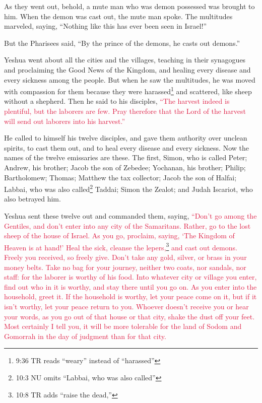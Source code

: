 \myverse{}As they went out, behold, a mute man who was demon possessed
was brought to him.
\myverse{}When the demon was cast out, the mute man spoke. The multitudes marveled,
saying, “Nothing like this has ever been seen in Israel!”

\myverse{}But the Pharisees said, “By the prince of the demons, he casts
out demons.”

\myverse{}Yeshua went about all the cities and the villages, teaching in
their synagogues and proclaiming the Good News of the Kingdom, and healing every disease and every sickness
among the people.
\myverse{}But when he saw the multitudes, he was moved with compassion for them because
they were harassed\footnote{9:36 TR reads “weary” instead of “harassed”
} and scattered, like sheep without a shepherd.
\myverse{}Then he said to his disciples,
\textcolor{crimson}{“The harvest indeed is plentiful, but the laborers are few.
}
\myverse{}\textcolor{crimson}{Pray therefore that the Lord of the harvest will send out laborers into
	his harvest.”}


\mychapter{} \myverse*{}He called to himself his twelve disciples, and gave them authority
over unclean spirits, to cast them out, and to heal every disease and every sickness.
\myverse{}Now the names of the twelve emissaries are these. The first, Simon, who is
called Peter; Andrew, his brother; Jacob the son of Zebedee; Yochanan, his brother;
\myverse{}Philip; Bartholomew; Thomas; Matthew the tax collector; Jacob the son of Halfai;
Labbai, who was also called\footnote{10:3 NU omits “Labbai, who was also called”} Taddai;
\myverse{}Simon the Zealot; and Judah Iscariot, who also betrayed him.

\myverse{}Yeshua sent these twelve out and commanded them, saying,
\textcolor{crimson}{“Don’t go among the Gentiles, and don’t enter into any city of the Samaritans.
}
\myverse{}\textcolor{crimson}{Rather, go to the lost sheep of the house of Israel.
}
\myverse{}\textcolor{crimson}{As you go, proclaim, saying, ‘The Kingdom of Heaven is at hand!’
}
\myverse{}\textcolor{crimson}{Heal the sick, cleanse the lepers,}\footnote{10:8 TR adds “raise the dead,”}
\textcolor{crimson}{and cast out demons. Freely you received, so freely give.
}
\myverse{}\textcolor{crimson}{Don’t take any gold, silver, or brass in your money belts.
}
\myverse{}\textcolor{crimson}{Take no bag for your journey, neither two coats, nor sandals, nor staff:
	for the laborer is worthy of his food.
}
\myverse{}\textcolor{crimson}{Into whatever city or village you enter, find out who in it is worthy,
	and stay there until you go on.
}
\myverse{}\textcolor{crimson}{As you enter into the household, greet it.
}
\myverse{}\textcolor{crimson}{If the household is worthy, let your peace come on it, but if it isn’t
	worthy, let your peace return to you.
}
\myverse{}\textcolor{crimson}{Whoever doesn’t receive you or hear your words, as you go out of that
	house or that city, shake the dust off your feet.
}
\myverse{}\textcolor{crimson}{Most certainly I tell you, it will be more tolerable for the land of
	Sodom and Gomorrah in the day of judgment than for that city.}

